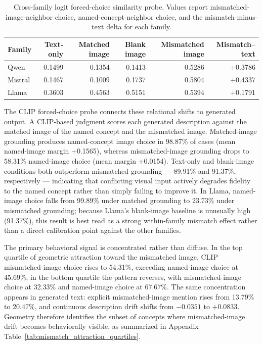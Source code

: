 \documentclass{article}
\begin{document}
\begin{table}[!htbp]
\centering
\caption{Cross-family logit forced-choice similarity probe. Values report mismatched-image-neighbor choice, named-concept-neighbor choice, and the mismatch-minus-text delta for each family.}
\label{tab:cross_model_logit_forced_choice_main}
\small
\begin{tabular}{lrrrrr}
\toprule
Family & Text-only & Matched image & Blank image & Mismatched image & Mismatch--text \\
\midrule
Qwen & 0.1499 & 0.1354 & 0.1413 & 0.5286 & +0.3786 \\
Mistral & 0.1467 & 0.1009 & 0.1737 & 0.5804 & +0.4337 \\
Llama & 0.3603 & 0.4563 & 0.5151 & 0.5394 & +0.1791 \\
\bottomrule
\end{tabular}
\end{table}

The CLIP forced-choice probe connects these relational shifts to generated output. A CLIP-based judgment scores each generated description against the matched image of the named concept and the mismatched image. Matched-image grounding produces named-concept image choice in 98.87\% of cases (mean named-image margin +0.1565), whereas mismatched-image grounding drops to 58.31\% named-image choice (mean margin +0.0154). Text-only and blank-image conditions both outperform mismatched grounding --- 89.91\% and 91.37\%, respectively --- indicating that conflicting visual input actively degrades fidelity to the named concept rather than simply failing to improve it. In Llama, named-image choice falls from 99.89\% under matched grounding to 23.73\% under mismatched grounding; because Llama's blank-image baseline is unusually high (91.37\%), this result is best read as a strong within-family mismatch effect rather than a direct calibration point against the other families.

The primary behavioral signal is concentrated rather than diffuse. In the top quartile of geometric attraction toward the mismatched image, CLIP mismatched-image choice rises to 54.31\%, exceeding named-image choice at 45.69\%; in the bottom quartile the pattern reverses, with mismatched-image choice at 32.33\% and named-image choice at 67.67\%. The same concentration appears in generated text: explicit mismatched-image mention rises from 13.79\% to 20.47\%, and continuous description drift shifts from $-0.0351$ to $+0.0833$. Geometry therefore identifies the subset of concepts where mismatched-image drift becomes behaviorally visible, as summarized in Appendix Table~\ref{tab:mismatch_attraction_quartiles}.
\end{document}
